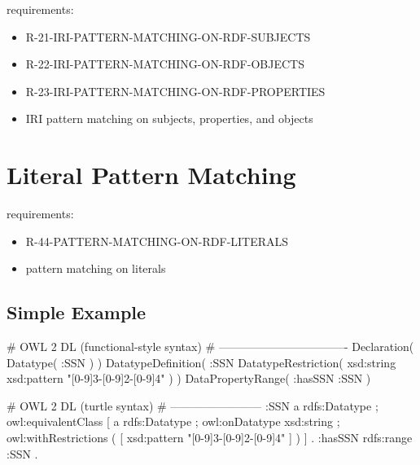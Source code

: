 \documentclass{llncs}
\begin{document}
requirements:

\begin{itemize}
	\item R-21-IRI-PATTERN-MATCHING-ON-RDF-SUBJECTS
  \item R-22-IRI-PATTERN-MATCHING-ON-RDF-OBJECTS
  \item R-23-IRI-PATTERN-MATCHING-ON-RDF-PROPERTIES
\end{itemize}



\begin{itemize}
	\item IRI pattern matching on subjects, properties, and objects
\end{itemize}

\section{Literal Pattern Matching}

requirements:

\begin{itemize}
  \item R-44-PATTERN-MATCHING-ON-RDF-LITERALS
\end{itemize}



\begin{itemize}
	\item pattern matching on literals
\end{itemize}

\subsection{Simple Example}

\begin{ex}
# OWL 2 DL (functional-style syntax)
# ----------------------------------
Declaration( Datatype( :SSN ) ) 
DatatypeDefinition( 
    :SSN
    DatatypeRestriction( xsd:string xsd:pattern "[0-9]{3}-[0-9]{2}-[0-9]{4}" ) )     
DataPropertyRange( :hasSSN :SSN ) 
\end{ex}

\begin{ex}
# OWL 2 DL (turtle syntax)
# ------------------------
:SSN 
    a rdfs:Datatype ;
    owl:equivalentClass [
        a rdfs:Datatype ;
        owl:onDatatype xsd:string ;
        owl:withRestrictions ( 
            [ xsd:pattern "[0-9]{3}-[0-9]{2}-[0-9]{4}" ] ) ] .
:hasSSN rdfs:range :SSN .
\end{ex}
\end{document}
